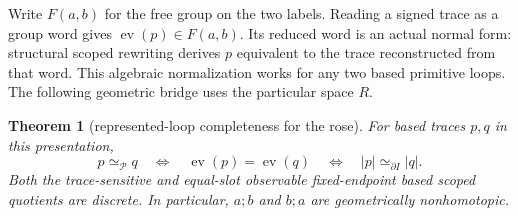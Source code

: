 \documentclass[10pt,reqno]{amsart}
\theoremstyle{definition}
\theoremstyle{plain}
\newtheorem{theorem}[definition]{Theorem}
\theoremstyle{remark}
\begin{document}
Write $F(a,b)$ for the free group on the two labels.  Reading a signed trace
as a group word gives $\operatorname{ev}(p)\in F(a,b)$.  Its reduced word is
an actual normal form: structural scoped rewriting derives $p$ equivalent
to the trace reconstructed from that word.  This algebraic normalization
works for any two based primitive loops.  The following geometric bridge
uses the particular space $R$.

\begin{theorem}[represented-loop completeness for the rose]
\label{thm:rose-completeness}
For based traces $p,q$ in this presentation,
\[
  p\simeq_{\mathcal P}q
  \quad\Longleftrightarrow\quad
  \operatorname{ev}(p)=\operatorname{ev}(q)
  \quad\Longleftrightarrow\quad
  |p|\simeq_{\partial I}|q|.
\]
Both the trace-sensitive and equal-slot observable fixed-endpoint based
scoped quotients are discrete.  In particular, $a;b$ and $b;a$ are
geometrically nonhomotopic.
\end{theorem}
\end{document}
